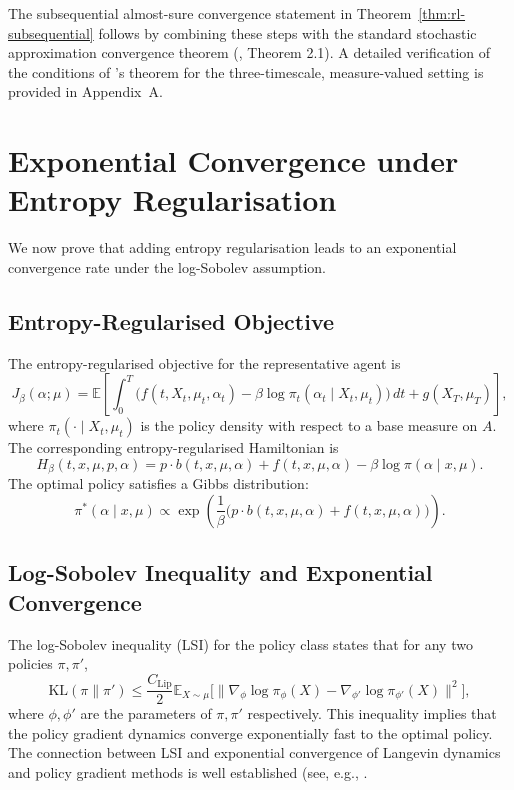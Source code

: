 The subsequential almost-sure convergence statement in
Theorem~\ref{thm:rl-subsequential} follows by combining these steps with the standard
stochastic approximation convergence theorem (\citep{borkar2008}, Theorem 2.1). A detailed
verification of the conditions of \citet{borkar1997,borkar2008}'s theorem for the three-timescale,
measure-valued setting is provided in Appendix~A.


\section{Exponential Convergence under Entropy Regularisation}
\label{sec:rl-entropy}

We now prove that adding entropy regularisation leads to an exponential convergence
rate under the log-Sobolev assumption.

\subsection{Entropy-Regularised Objective}

The entropy-regularised objective for the representative agent is
\[
    J_\beta(\alpha; \mu) = \mathbb{E}\left[ \int_0^T \big( f(t,X_t,\mu_t,\alpha_t) -
    \beta \log \pi_t(\alpha_t \mid X_t, \mu_t) \big)\, dt + g(X_T,\mu_T) \right],
\]
where $\pi_t(\cdot \mid X_t, \mu_t)$ is the policy density with respect to a base
measure on $A$. The corresponding entropy-regularised Hamiltonian is
\[
    H_\beta(t,x,\mu,p,\alpha) = p \cdot b(t,x,\mu,\alpha) + f(t,x,\mu,\alpha) - \beta
    \log \pi(\alpha \mid x, \mu).
\]
The optimal policy satisfies a Gibbs distribution:
\begin{equation}
    \pi^*(\alpha \mid x, \mu) \propto \exp\left( \frac{1}{\beta} \big( p \cdot
    b(t,x,\mu,\alpha) + f(t,x,\mu,\alpha) \big) \right).
    \label{eq:gibbs-policy}
\end{equation}

\subsection{Log-Sobolev Inequality and Exponential Convergence}

The log-Sobolev inequality (LSI) for the policy class states that for any two
policies $\pi, \pi'$,
\[
    \mathrm{KL}(\pi \| \pi') \leq \frac{C_{\mathrm{Lip}}}{2} \mathbb{E}_{X \sim \mu}
    \big[ \|\nabla_\phi \log \pi_\phi(X) - \nabla_{\phi'} \log \pi_{\phi'}(X)\|^2
    \big],
\]
where $\phi, \phi'$ are the parameters of $\pi, \pi'$ respectively. This inequality
implies that the policy gradient dynamics converge exponentially fast to the optimal
policy. The connection between LSI and exponential convergence of Langevin dynamics
and policy gradient methods is well established (see, e.g., \citep{malizhang2024}.

